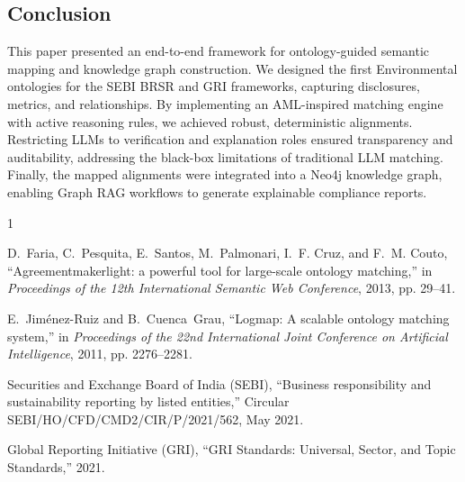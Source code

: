 \documentclass[journal,compsoc]{IEEEtran}
\begin{document}
\begin{itemize}
\begin{table}[t]

\section{Conclusion}
This paper presented an end-to-end framework for ontology-guided semantic mapping and knowledge graph construction. We designed the first Environmental ontologies for the SEBI BRSR and GRI frameworks, capturing disclosures, metrics, and relationships. By implementing an AML-inspired matching engine with active reasoning rules, we achieved robust, deterministic alignments. Restricting LLMs to verification and explanation roles ensured transparency and auditability, addressing the black-box limitations of traditional LLM matching. Finally, the mapped alignments were integrated into a Neo4j knowledge graph, enabling Graph RAG workflows to generate explainable compliance reports.


\begin{thebibliography}{1}

D.~Faria, C.~Pesquita, E.~Santos, M.~Palmonari, I.~F. Cruz, and F.~M. Couto,
  ``Agreementmakerlight: a powerful tool for large-scale ontology matching,''
  in \emph{Proceedings of the 12th International Semantic Web Conference},
  2013, pp. 29--41.

E.~Jim{\'e}nez-Ruiz and B.~Cuenca~Grau, ``Logmap: A scalable ontology matching
  system,'' in \emph{Proceedings of the 22nd International Joint Conference on
  Artificial Intelligence}, 2011, pp. 2276--2281.

Securities and Exchange Board of India (SEBI), ``Business responsibility and
  sustainability reporting by listed entities,'' Circular
  SEBI/HO/CFD/CMD2/CIR/P/2021/562, May 2021.

Global Reporting Initiative (GRI), ``GRI Standards: Universal, Sector, and
  Topic Standards,'' 2021.


\end{thebibliography}
\end{table}
\end{itemize}
\end{document}
